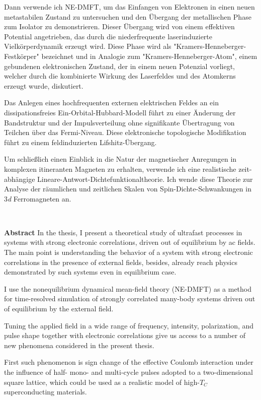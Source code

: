 Dann verwende ich NE-DMFT, um das Einfangen von Elektronen in einen neuen metastabilen Zustand zu untersuchen und den Übergang der metallischen Phase zum Isolator zu demonstrieren. 
Dieser Übergang wird von einem effektiven Potential angetrieben, das durch die niederfrequente laserinduzierte Vielkörperdynamik erzeugt wird. 
Diese Phase wird als "Kramers-Henneberger-Festkörper" bezeichnet und in Analogie zum "Kramers-Henneberger-Atom", einem gebundenen elektronischen Zustand, der in einem neuen Potenzial vorliegt, welcher durch die kombinierte Wirkung des Laserfeldes und des Atomkerns erzeugt wurde, diskutiert.

Das Anlegen eines hochfrequenten externen elektrischen Feldes an ein dissipationsfreies Ein-Orbital-Hubbard-Modell  führt zu einer Änderung der Bandstruktur und der Impulsverteilung ohne signifikante Übertragung von Teilchen über das Fermi-Niveau. 
Diese elektronische topologische Modifikation führt zu einem feldinduzierten Lifshitz-Übergang.

Um schließlich einen Einblick in die Natur der magnetischer Anregungen in komplexen itineranten Magneten zu erhalten, verwende ich eine realistische zeit-abhängige Lineare-Antwort-Dichtefunktionaltheorie. 
Ich wende diese Theorie zur Analyse der räumlichen und zeitlichen Skalen von Spin-Dichte-Schwankungen in 3\emph{d} Ferromagneten an.


\newpage
~
\newpage

\textbf{Abstract} In the thesis, I present a theoretical study of ultrafast processes in systems with strong electronic correlations, driven out of equilibrium by ac fields.
The main point is understanding the behavior of a system with strong electronic correlations in the presence of external fields, besides, already reach physics demonstrated by such systems even in equilibrium case.

I use the nonequilibrium dynamical mean-field theory (NE-DMFT) as a method for time-resolved simulation of strongly correlated many-body systems driven out of equilibrium by the external field.

Tuning the applied field in a wide range of frequency, intensity, polarization, and pulse shape together with electronic correlations give us access to a number of new phenomena considered in the present thesis.

First such phenomenon is sign change of the effective Coulomb interaction under the influence of half- mono- and multi-cycle pulses adopted to a two-dimensional square lattice, which could be used as a realistic model of high-$T_C$ superconducting materials.

